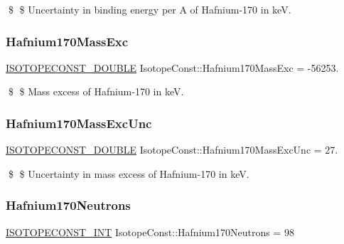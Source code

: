 \$ \$ Uncertainty in binding energy per A of Hafnium-\/170 in keV. \mbox{\label{group___isotope_const-_hafnium-_hf170_gaf59881b02aebee60b1afd27ae2f39992}} 
\subsubsection{\texorpdfstring{Hafnium170\+Mass\+Exc}{Hafnium170MassExc}}
{\footnotesize\ttfamily \mbox{\hyperlink{group___isotope_const-_macros_ga8f45a7272ce02c0b4c65c44636ed719a}{I\+S\+O\+T\+O\+P\+E\+C\+O\+N\+S\+T\+\_\+\+D\+O\+U\+B\+LE}} Isotope\+Const\+::\+Hafnium170\+Mass\+Exc = -\/56253.}

\$ \$ Mass excess of Hafnium-\/170 in keV. \mbox{\label{group___isotope_const-_hafnium-_hf170_ga95705977bef445e15e6e9c0714a874b4}} 
\subsubsection{\texorpdfstring{Hafnium170\+Mass\+Exc\+Unc}{Hafnium170MassExcUnc}}
{\footnotesize\ttfamily \mbox{\hyperlink{group___isotope_const-_macros_ga8f45a7272ce02c0b4c65c44636ed719a}{I\+S\+O\+T\+O\+P\+E\+C\+O\+N\+S\+T\+\_\+\+D\+O\+U\+B\+LE}} Isotope\+Const\+::\+Hafnium170\+Mass\+Exc\+Unc = 27.}

\$ \$ Uncertainty in mass excess of Hafnium-\/170 in keV. \mbox{\label{group___isotope_const-_hafnium-_hf170_ga2c8ed479e75a210b0cf9811248fdae8f}} 
\subsubsection{\texorpdfstring{Hafnium170\+Neutrons}{Hafnium170Neutrons}}
{\footnotesize\ttfamily \mbox{\hyperlink{group___isotope_const-_macros_ga5f18360b3e99483a35c32d789e62621c}{I\+S\+O\+T\+O\+P\+E\+C\+O\+N\+S\+T\+\_\+\+I\+NT}} Isotope\+Const\+::\+Hafnium170\+Neutrons = 98}

